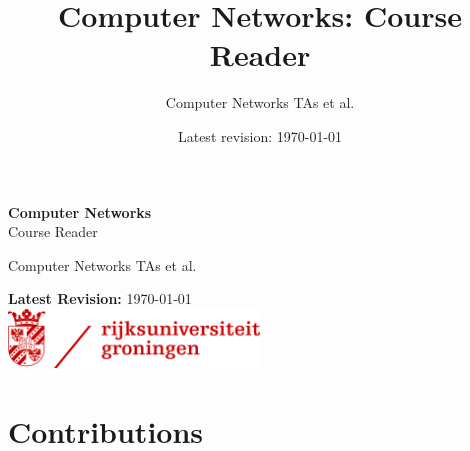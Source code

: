 \documentclass[11pt,a4paper,twoside]{book}
\title{Computer Networks: Course Reader}
\author{Computer Networks TAs et al.}
\date{Latest revision: \today}
\theoremstyle{definition}
\theoremstyle{plain}
\begin{document}
\frontmatter
\begin{titlepage}
    \vspace*{\fill}
    \centering
    {\fontsize{40}{48}\selectfont\bfseries\sffamily Computer Networks}\\[0.5cm]
    {\fontsize{30}{36}\selectfont\sffamily Course Reader}

    \vspace{1.5cm}


    \vspace{2cm}

    {\fontsize{20}{24}\selectfont\sffamily Computer Networks TAs et al.}

    \vspace*{\fill}

    \centering

    {\fontsize{16}{19}\selectfont\sffamily\textbf{Latest Revision:} \today}\\[0.3cm]
    \vspace{0.5cm}
    \includegraphics[width=0.5\textwidth]{assets/rug.png}

    \vspace{1cm}
    
\end{titlepage}

\newpage
\tableofcontents



\mainmatter




\appendix


\backmatter
\listoffigures
\listoftables
\chapter*{Contributions}\label{sec:contributions}

\end{document}
